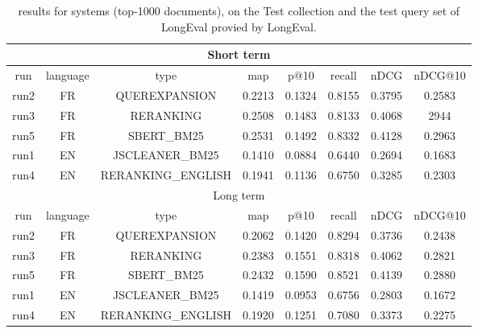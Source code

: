 \begin{table}[h!]
    \centering
    \caption{results for systems (top-1000 documents), on the Test collection and the test query set of LongEval provied by LongEval.}
    \begin{tabular}{ |c|c|c|c|c|c|c|c| }
        \hline
        \hline
        \multicolumn{8}{|c|}{Short term} \\ \hline
        run  & language & type & map & p@10 & recall & nDCG & nDCG@10 \\ \hline
        run2 &   FR   & QUEREXPANSION & 0.2213 & 0.1324 & 0.8155 & 0.3795 & 0.2583 \\
        run3 &   FR   & RERANKING & 0.2508 & 0.1483 & 0.8133 & 0.4068 & 2944 \\
        run5 &   FR   & SBERT\_BM25 & 0.2531 & 0.1492 & 0.8332 & 0.4128 & 0.2963 \\
        \hline
        run1 &   EN   & JSCLEANER\_BM25 & 0.1410 & 0.0884 & 0.6440 & 0.2694 & 0.1683 \\
        run4 &   EN   & RERANKING\_ENGLISH & 0.1941 & 0.1136 & 0.6750 & 0.3285 & 0.2303 \\
        \hline
        \hline
        \multicolumn{8}{|c|}{Long term} \\ \hline
        run  & language & type & map & p@10 & recall & nDCG & nDCG@10 \\ \hline
        run2 &   FR   & QUEREXPANSION & 0.2062 & 0.1420 & 0.8294 & 0.3736 & 0.2438 \\
        run3 &   FR   & RERANKING & 0.2383 & 0.1551 & 0.8318 & 0.4062 & 0.2821 \\
        run5 &   FR   & SBERT\_BM25 & 0.2432 & 0.1590 & 0.8521 & 0.4139 & 0.2880 \\
        \hline
        run1 &   EN   & JSCLEANER\_BM25 & 0.1419 & 0.0953 & 0.6756 & 0.2803 & 0.1672 \\
        run4 &   EN   & RERANKING\_ENGLISH & 0.1920 & 0.1251 & 0.7080 & 0.3373 & 0.2275 \\
        \hline
    \end{tabular}
    \label{tab:results_submission_test}
\end{table}
